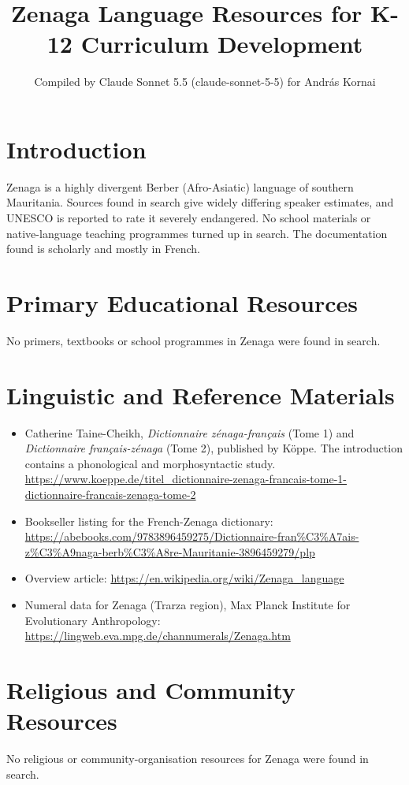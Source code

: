 \documentclass[12pt]{article}
\title{Zenaga Language Resources for K-12 Curriculum Development}
\author{Compiled by Claude Sonnet 5.5 (claude-sonnet-5-5) for Andr\'as Kornai}
\date{}
\begin{document}
\maketitle

\section{Introduction}
Zenaga is a highly divergent Berber (Afro-Asiatic) language of southern Mauritania. Sources found in search give widely differing speaker estimates, and UNESCO is reported to rate it severely endangered. No school materials or native-language teaching programmes turned up in search. The documentation found is scholarly and mostly in French.

\section{Primary Educational Resources}
No primers, textbooks or school programmes in Zenaga were found in search.

\section{Linguistic and Reference Materials}
\begin{itemize}
\item Catherine Taine-Cheikh, \emph{Dictionnaire z\'enaga-fran\c{c}ais} (Tome 1) and \emph{Dictionnaire fran\c{c}ais-z\'enaga} (Tome 2), published by K\"oppe. The introduction contains a phonological and morphosyntactic study. \url{https://www.koeppe.de/titel_dictionnaire-zenaga-francais-tome-1-dictionnaire-francais-zenaga-tome-2}
\item Bookseller listing for the French-Zenaga dictionary: \url{https://abebooks.com/9783896459275/Dictionnaire-fran%C3%A7ais-z%C3%A9naga-berb%C3%A8re-Mauritanie-3896459279/plp}
\item Overview article: \url{https://en.wikipedia.org/wiki/Zenaga_language}
\item Numeral data for Zenaga (Trarza region), Max Planck Institute for Evolutionary Anthropology: \url{https://lingweb.eva.mpg.de/channumerals/Zenaga.htm}
\end{itemize}

\section{Religious and Community Resources}
No religious or community-organisation resources for Zenaga were found in search.
\end{document}
